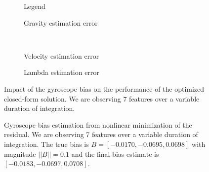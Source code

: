 \documentclass[letterpaper, 10 pt, journal, twoside]{IEEEtran}  %
\begin{document}
\begin{figure}[!ht]
  \centering
        \hspace{0.2\columnwidth}%
        \begin{subfigure}[b]{0.3\columnwidth}
                \resizebox{\columnwidth}{!}{}
                \caption{Legend}

        \end{subfigure}%
        \begin{subfigure}[b]{0.5\columnwidth}
                \resizebox{\columnwidth}{!}{}
                \caption{Gravity estimation error}

        \end{subfigure}
        ~
        \begin{subfigure}[b]{0.5\columnwidth}
                \resizebox{\columnwidth}{!}{}
                \caption{Velocity estimation error}

        \end{subfigure}%
        \begin{subfigure}[b]{0.5\columnwidth}
                \resizebox{\columnwidth}{!}{}
                \caption{Lambda estimation error}

        \end{subfigure}
        \caption{Impact of the gyroscope bias on the performance of the optimized closed-form solution. We are observing 7 features  over a variable duration of integration. \label{fig:biasGyroOpt}}
\end{figure}

\begin{figure}[!ht]
  \centering
  \resizebox{0.7\columnwidth}{!}{}
  \caption{Gyroscope bias estimation from nonlinear minimization of the residual.
    We are observing 7 features over a variable duration of integration.
    The true bias is $B=[-0.0170, -0.0695, 0.0698]$ with magnitude $||B||=0.1$ and the final bias estimate is $[-0.0183, -0.0697, 0.0708]$.\label{fig:gBiasEstimate}}
\end{figure}


\end{document}
